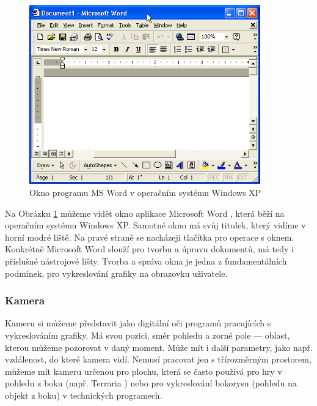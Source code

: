 \documentclass[12pt]{article}
\begin{document}
\vspace{0.5cm}
\begin{figure}[h]
    \centering
    \includegraphics[width=10cm]{images/xp_window.png}
    \caption[Okno programu MS Word v operačním systému Windows XP]{Okno programu MS Word v operačním systému Windows XP \cite{xp_window}}
    \label{fig:Okno programu MS Word v operačním systému Windows XP}
\end{figure}

Na Obrázku \ref{fig:Okno programu MS Word v operačním systému Windows XP} můžeme vidět okno aplikace Microsoft Word \cite{word}, která běží na operačním systému Windows XP. Samotné okno má svůj titulek, který vidíme v horní modré liště. Na pravé straně se nacházejí tlačítka pro operace s oknem. Konkrétně Microsoft Word slouží pro tvorbu a úpravu dokumentů, má tedy i příslušné nástrojové lišty. Tvorba a správa okna je jedna z fundamentálních podmínek, pro vykreslování grafiky na obrazovku uživatele.

\subsubsection{Kamera}

Kameru si můžeme představit jako digitální oči programů pracujících s vykreslováním grafiky. Má svou pozici, směr pohledu a zorné pole — oblast, kterou můžeme pozorovat v daný moment. Může mít i další parametry, jako např. vzdálenost, do které kamera vidí. Nemusí pracovat jen s třírozměrným prostorem, můžeme mít kameru určenou pro plochu, která se často používá pro hry v pohledu z boku (např. Terraria \cite{terraria}) nebo pro vykreslování bokorysu (pohledu na objekt z boku) v technických programech. \cite{camera}
\end{document}
